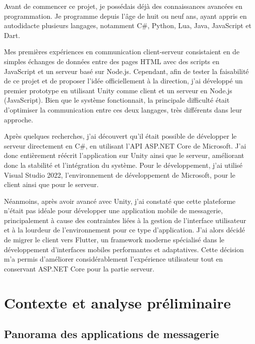 \documentclass[12pt]{report}
\begin{document}
Avant de commencer ce projet, je possédais déjà des connaissances avancées en programmation. Je programme depuis l’âge de huit ou neuf ans, ayant appris en autodidacte plusieurs langages, notamment C\#\supercite{csharp}, Python, Lua, Java, JavaScript\supercite{nodejs} et Dart\supercite{dart}.

Mes premières expériences en communication client-serveur consistaient en de simples échanges de données entre des pages HTML avec des scripts en JavaScript\supercite{nodejs} et un serveur basé sur Node.js\supercite{nodejs}. Cependant, afin de tester la faisabilité de ce projet et de proposer l’idée officiellement à la direction, j’ai développé un premier prototype en utilisant Unity\supercite{visualstudio} comme client et un serveur en Node.js (JavaScript\supercite{nodejs}). Bien que le système fonctionnait, la principale difficulté était d’optimiser la communication entre ces deux langages, très différents dans leur approche.

Après quelques recherches, j’ai découvert qu’il était possible de développer le serveur directement en C\#\supercite{csharp}, en utilisant l’API ASP.NET Core\supercite{aspnetcore} de Microsoft. J’ai donc entièrement réécrit l’application sur Unity\supercite{visualstudio} ainsi que le serveur, améliorant donc la stabilité et l’intégration du système. Pour le développement, j’ai utilisé Visual Studio 2022\supercite{visualstudio}, l’environnement de développement de Microsoft, pour le client ainsi que pour le serveur.

Néanmoins, après avoir avancé avec Unity\supercite{visualstudio}, j’ai constaté que cette plateforme n’était pas idéale pour développer une application mobile de messagerie, principalement à cause des contraintes liées à la gestion de l’interface utilisateur et à la lourdeur de l’environnement pour ce type d’application. J’ai alors décidé de migrer le client vers Flutter\supercite{flutter}, un framework moderne spécialisé dans le développement d’interfaces mobiles performantes et adaptatives. Cette décision m’a permis d’améliorer considérablement l’expérience utilisateur tout en conservant ASP.NET Core\supercite{aspnetcore} pour la partie serveur.


\chapter{Contexte et analyse préliminaire}

\section{Panorama des applications de messagerie}
\end{document}

